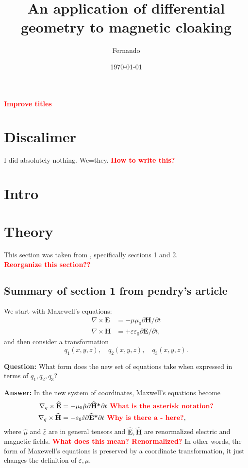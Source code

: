 \documentclass{amsart}
\begin{document}
\newcommand{\R}{\mathbb{R}}
\newcommand\tbf[1]{\textbf{#1}}
\newcommand\myworries[1]{\textcolor{red}{\tbf{#1}}}

\title{An application of differential geometry to magnetic cloaking}
\author{Fernando}
\date{\today}
\maketitle

\myworries{Improve titles}
\section{Discalimer}
I did absolutely nothing. We=they.
\myworries{How to write this?}
\section{Intro}
\blindtext[1]
\section{Theory}
This section was taken from \cite{ward96}, specifically sections 1 and 2.
\myworries{\\Reorganize this section??}
\subsection{Summary of section 1 from pendry's article}
We start with Maxewell's equations:
\begin{align*}
  \nabla \times \tbf{E} &= -\mu \mu_0 \partial \tbf{H} /\partial t\\
  \nabla \times \tbf{H} &= +\varepsilon \varepsilon_0 \partial \tbf{E} /\partial t,
\end{align*}
and then consider a transformation
\[
q_1(x,y,z), \quad q_2(x,y,z), \quad q_3(x,y,z).
\]

\tbf{Question:} What form does the new set of equations take when
expressed in terms of $q_1,q_2,q_3$?

\tbf{Answer:} In the new system of coordinates, Maxwell's equations become
\begin{align*}
  \nabla_q \times \widehat{\tbf{E}} &= -\mu_0\hat{\mu} \partial \widehat{\tbf{H}} \tbf{*}\partial t \myworries{ What is the asterisk notation?}\\
  \nabla_q \times \widehat{\tbf{H}} &= -\varepsilon_0 \hat{\varepsilon} \partial \widehat{\tbf{E}}\tbf{*}\partial t \myworries{ Why is there a - here?},
\end{align*}
where $\hat{\mu}$ and $\hat{\varepsilon}$ are in general tensors and $\hat{\tbf{E}},\hat{\tbf{H}}$ are renormalized electric and magnetic fields.\myworries{ What does this mean? Renormalized?}
In other words, the form of Maxewell's equations is preserved by a coordinate transformation, it just changes the definition of $\varepsilon,\mu$.
\end{document}

